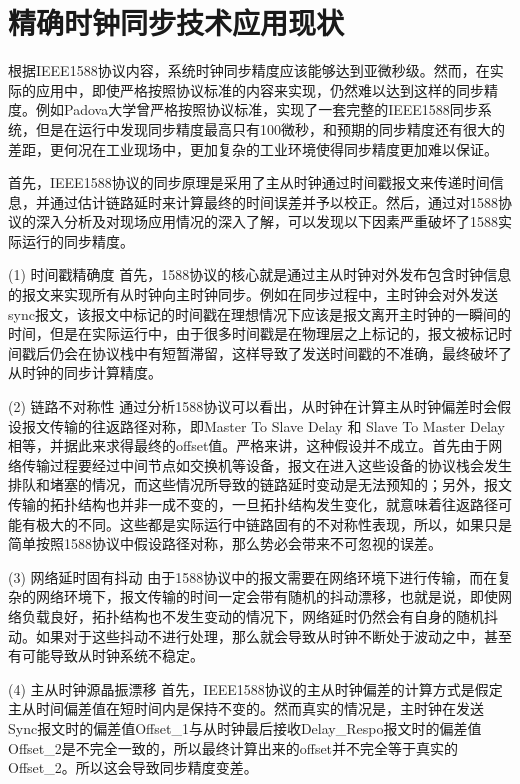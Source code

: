 \section{精确时钟同步技术应用现状}
根据IEEE1588协议内容，系统时钟同步精度应该能够达到亚微秒级\supercite{2}。然而，在实际的应用中，即使严格按照协议标准的内容来实现，仍然难以达到这样的同步精度。例如Padova大学曾严格按照协议标准，实现了一套完整的IEEE1588同步系统\supercite{3}，但是在运行中发现同步精度最高只有100微秒，和预期的同步精度还有很大的差距，更何况在工业现场中，更加复杂的工业环境使得同步精度更加难以保证。

首先，IEEE1588协议的同步原理是采用了主从时钟通过时间戳报文来传递时间信息，并通过估计链路延时来计算最终的时间误差并予以校正。然后，通过对1588协议的深入分析及对现场应用情况的深入了解，可以发现以下因素严重破坏了1588实际运行的同步精度。

(1) 时间戳精确度
首先，1588协议的核心就是通过主从时钟对外发布包含时钟信息的报文来实现所有从时钟向主时钟同步。例如在同步过程中，主时钟会对外发送sync报文，该报文中标记的时间戳在理想情况下应该是报文离开主时钟的一瞬间的时间，但是在实际运行中，由于很多时间戳是在物理层之上标记的，报文被标记时间戳后仍会在协议栈中有短暂滞留，这样导致了发送时间戳的不准确，最终破坏了从时钟的同步计算精度。

(2) 链路不对称性
通过分析1588协议可以看出，从时钟在计算主从时钟偏差时会假设报文传输的往返路径对称，即Master To Slave Delay 和 Slave To Master Delay相等，并据此来求得最终的offset值。严格来讲，这种假设并不成立。首先由于网络传输过程要经过中间节点如交换机等设备，报文在进入这些设备的协议栈会发生排队和堵塞的情况，而这些情况所导致的链路延时变动是无法预知的；另外，报文传输的拓扑结构也并非一成不变的，一旦拓扑结构发生变化，就意味着往返路径可能有极大的不同。这些都是实际运行中链路固有的不对称性表现，所以，如果只是简单按照1588协议中假设路径对称，那么势必会带来不可忽视的误差。

(3) 网络延时固有抖动
由于1588协议中的报文需要在网络环境下进行传输，而在复杂的网络环境下，报文传输的时间一定会带有随机的抖动漂移，也就是说，即使网络负载良好，拓扑结构也不发生变动的情况下，网络延时仍然会有自身的随机抖动。如果对于这些抖动不进行处理，那么就会导致从时钟不断处于波动之中，甚至有可能导致从时钟系统不稳定。

(4) 主从时钟源晶振漂移
首先，IEEE1588协议的主从时钟偏差的计算方式是假定主从时间偏差值在短时间内是保持不变的。然而真实的情况是，主时钟在发送Sync报文时的偏差值Offset\_1与从时钟最后接收Delay\_Respo报文时的偏差值Offset\_2是不完全一致的，所以最终计算出来的offset并不完全等于真实的Offset\_2。所以这会导致同步精度变差。

